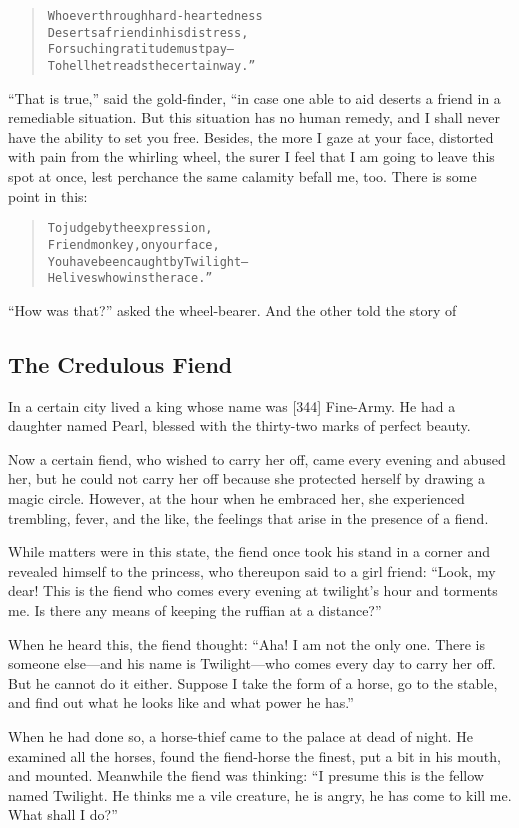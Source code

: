 \documentclass[article, twoside, 14pt]{memoir}
\renewenvironment{verbatim}{%
\begin{quote}%
\vskip -10pt%
\begin{alltt}\normalfont\large}{\end{alltt}%
\end{quote}%
\vskip -10pt
} %
\begin{document}
\begin{verbatim}
Whoever through hard-heartedness
Deserts a friend in his distress,
For such ingratitude must pay--
To hell he treads the certain way.”
\end{verbatim}
``That is true,'' said the gold-finder, “in case one able to aid
deserts a friend in a remediable situation. But this situation has
no human remedy, and I shall never have the ability to set you
free. Besides, the more I gaze at your face, distorted with pain
from the whirling wheel, the surer I feel that I am going to leave
this spot at once, lest perchance the same calamity befall me, too.
There is some point in this:

\begin{verbatim}
To judge by the expression,
    Friend monkey, on your face,
You have been caught by Twilight--
    He lives who wins the race.”
\end{verbatim}
``How was that?'' asked the wheel-bearer. And the other told the
story of

\subsection{The Credulous Fiend}

\label{s88}

In a certain city lived a king whose name was [344] Fine-Army. He
had a daughter named Pearl, blessed with the thirty-two marks of
perfect beauty.

Now a certain fiend, who wished to carry her off, came every
evening and abused her, but he could not carry her off because she
protected herself by drawing a magic circle. However, at the hour
when he embraced her, she experienced trembling, fever, and the
like, the feelings that arise in the presence of a fiend.

While matters were in this state, the fiend once took his stand in
a corner and revealed himself to the princess, who thereupon said
to a girl friend:
``Look, my dear! This is the fiend who comes every evening at twilight's hour and torments me. Is there any means of keeping the ruffian at a distance?''

When he heard this, the fiend thought:
``Aha! I am not the only one. There is someone else---and his name is Twilight---who comes every day to carry her off. But he cannot do it either. Suppose I take the form of a horse, go to the stable, and find out what he looks like and what power he has.''

When he had done so, a horse-thief came to the palace at dead of
night. He examined all the horses, found the fiend-horse the
finest, put a bit in his mouth, and mounted. Meanwhile the fiend
was thinking:
``I presume this is the fellow named Twilight. He thinks me a vile creature, he is angry, he has come to kill me. What shall I do?''
\end{document}
